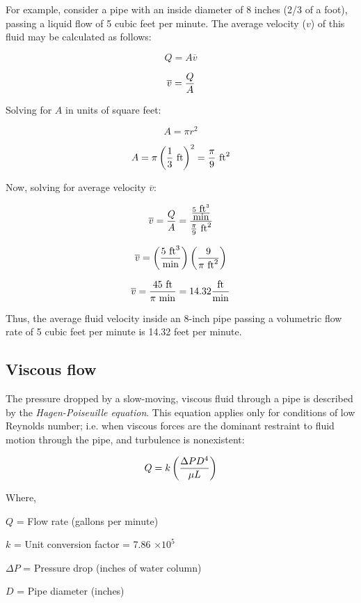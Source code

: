 \filbreak

For example, consider a pipe with an inside diameter of 8 inches (2/3 of a foot), passing a liquid flow of 5 cubic feet per minute.  The average velocity ($v$) of this fluid may be calculated as follows:

$$Q = A \overline{v}$$

$$\overline{v} = {Q \over A}$$

Solving for $A$ in units of square feet:

$$A = \pi r^2$$

$$A = \pi \left({1 \over 3} \hbox{ ft}\right)^2 = {\pi \over 9} \hbox{ ft}^2$$

Now, solving for average velocity $\overline{v}$:

$$\overline{v} = {Q \over A} = {{5 \hbox{ ft}^3 \over \hbox{min}} \over {{\pi \over 9} \hbox{ ft}^2}}$$

$$\overline{v} = \left({5 \hbox{ ft}^3 \over \hbox{min}}\right) \left({9 \over {\pi \hbox{ ft}^2}}\right)$$

$$\overline{v} = {45 \hbox{ ft} \over \pi \hbox{ min}} = 14.32 {\hbox{ft} \over \hbox{min}}$$

Thus, the average fluid velocity inside an 8-inch pipe passing a volumetric flow rate of 5 cubic feet per minute is 14.32 feet per minute.





\filbreak
\subsection{Viscous flow}

The pressure dropped by a slow-moving, viscous fluid through a pipe is described by the \textit{Hagen-Poiseuille equation}.  This equation applies only for conditions of low Reynolds number; i.e. when viscous forces are the dominant restraint to fluid motion through the pipe, and turbulence is nonexistent:   

$$Q = k \left({{\Delta P D^4} \over {\mu L}}\right)$$

\noindent
Where,

$Q$ = Flow rate (gallons per minute)

$k$ = Unit conversion factor = 7.86 $\times 10^5$

$\Delta P$ = Pressure drop (inches of water column)

$D$ = Pipe diameter (inches)

